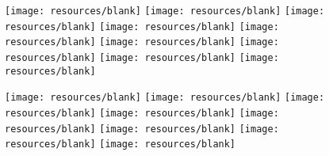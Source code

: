 \documentclass[11pt]{article}
\begin{document}
\begin{figure}[htbp]
\begin{minipage}[t]{0.125\textwidth}
  \end{minipage}%
  \begin{minipage}[t]{0.125\textwidth} %
    \centering
    \vspace{-0.3871\linewidth} %
    \texttt{[image: resources/blank]}
    \texttt{[image: resources/blank]}
    \texttt{[image: resources/blank]}
    \texttt{[image: resources/blank]}
    \texttt{[image: resources/blank]}
    \texttt{[image: resources/blank]}
    \texttt{[image: resources/blank]}
    \texttt{[image: resources/blank]}
    \texttt{[image: resources/blank]}

  \end{minipage}%
  \begin{minipage}[t]{0.125\textwidth} %
    \centering
    \texttt{[image: resources/blank]}
    \texttt{[image: resources/blank]}
    \texttt{[image: resources/blank]}
    \texttt{[image: resources/blank]}
    \texttt{[image: resources/blank]}
    \texttt{[image: resources/blank]}
    \texttt{[image: resources/blank]}
    \texttt{[image: resources/blank]}

  \end{minipage}%
  \label{fig:figure}
\end{figure}
\end{document}
